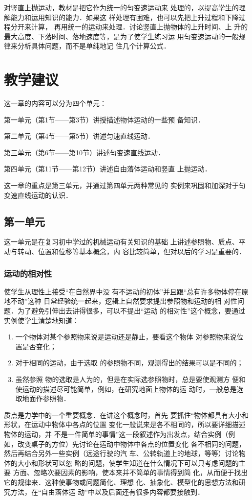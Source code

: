 对竖直上抛运动，教材是把它作为统一的匀变速运动来
处理的，以提高学生的理解能力和运用知识的能力．如果这
样处理有困难，也可以先把上升过程和下降过程分开来计算，
再用统一的运动来处理．讨论竖直上抛物体的上升时间、上
升的最大高度、下落时间、落地速度等，是为了使学生练习运
用匀变速运动的一般规律来分析具体问题，而不是单纯地记
住几个计算公式．

\section{教学建议}
这一章的内容可以分为四个单元：

第一单元（第1节——第3节）讲授描述物体运动的一些预
备知识．

第二单元（第4节——第5节）讲述匀速直线运动．

第三单元（第6节——第10节）讲述匀变速直线运动．

第四单元（第11节——第12节）讲述自由落体运动和竖直
上抛运动．

这一章的重点是第三单元，并通过第四单元两种常见的
实例来巩固和加深对于匀变速直线运动的认识．

\subsection{第一单元}
这一单元是在复习初中学过的机械运动有关知识的基础
上讲述参照物、质点、平动与转动、位置和位移等基本概念，内
容比较简单，但对以后的学习是重要的．

\subsubsection{运动的相对性}

使学生从理性上接受“在自然界中没
有不运动的初体”并且跟“总有许多物体停在原地不动”这种
日常经验统一起来，逻辑上自然要求提出参照物和运动的相
对性问题．为了避免引伸出去讲得很多，可以不提出“运动
的相对性”这个概念，要通过实例使学生清楚地知道：
\begin{enumerate}
    \item 一个物体对某个参照物来说是运动还是静止，要看这个物体
    对参照物来说位置是否变化；
    \item 对于相同的运动，由于选取
    的参照物不同，观测得出的结果可以是不同的；
    \item 虽然参照
    物的选取是人为的，但是在实际选参照物时，总是要使观测方
    便和使运动的描述尽可能简单，例如，在研究地面上物体的运
    动时，一般总是选取地面作参照物．
\end{enumerate}

质点是力学中的一个重要概念．在讲这个概念时，首先
要抓住“物体都具有大小和形状，在运动中物体中各点的位置
变化一般说来是各不相同的，所以要详细描述物体的运动，并
不是一件简单的事情”这一段叙述作为出发点，结合实例（例
如，改变桌子的方位）先讨论在运动中物体中各点的位置变化
各不相同的问题，然后再结合另外一些实例（远途行驶的汽
车、公转轨道上的地球，等等）讨论物体的大小和形状可以忽
略的问题，使学生知道在什么情况下可以只考虑问题的主要
方面、忽略次要因素的影响，使本来并不简单的事情得到简
化，从而便于找出它的规律来．这种使事物或问题简化、理想
化、抽象化、模型化的思想方法和研究方法，在“自由落体运
动”中以及后面还有很多内容都要接触到．

